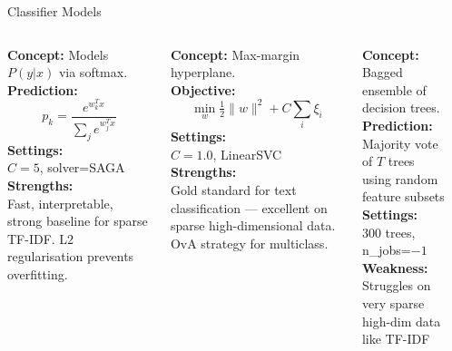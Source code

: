 \documentclass[aspectratio=169,11pt]{beamer}
\begin{document}
\begin{frame}{Classifier Models}
\begin{columns}[T]
    \begin{tcolorbox}[colback=worldcol!10,colframe=worldcol,title=Logistic Regression,fonttitle=\tiny\bfseries,height=7cm]
      \tiny
      \textbf{Concept:} Models $P(y|x)$ via softmax.\\[3pt]
      \textbf{Prediction:}
      \[p_k = \frac{e^{w_k^T x}}{\sum_j e^{w_j^T x}}\]
      \textbf{Settings:}\\
      $C=5$, solver=SAGA\\[3pt]
      \textbf{Strengths:}\\
      Fast, interpretable, strong baseline for sparse TF-IDF. L2 regularisation prevents overfitting.
    \end{tcolorbox}
    \begin{tcolorbox}[colback=sportscol!10,colframe=sportscol,title=Linear SVM,fonttitle=\tiny\bfseries,height=7cm]
      \tiny
      \textbf{Concept:} Max-margin hyperplane.\\[3pt]
      \textbf{Objective:}
      \[\min_w \tfrac{1}{2}\|w\|^2 + C\sum_i \xi_i\]
      \textbf{Settings:}\\
      $C=1.0$, LinearSVC\\[3pt]
      \textbf{Strengths:}\\
      Gold standard for text classification --- excellent on sparse high-dimensional data. OvA strategy for multiclass.
    \end{tcolorbox}
    \begin{tcolorbox}[colback=businesscol!10,colframe=businesscol,title=Random Forest,fonttitle=\tiny\bfseries,height=7cm]
      \tiny
      \textbf{Concept:} Bagged ensemble of decision trees.\\[3pt]
      \textbf{Prediction:}\\
      Majority vote of $T$ trees using random feature subsets\\[3pt]
      \textbf{Settings:}\\
      300 trees, n\_jobs=$-1$\\[3pt]
      \textbf{Weakness:}\\
      Struggles on very sparse high-dim data like TF-IDF
    \end{tcolorbox}
    \begin{tcolorbox}[colback=scitechcol!10,colframe=scitechcol,title=MLP Neural Net,fonttitle=\tiny\bfseries,height=7cm]

\end{tcolorbox}
\end{columns}
\end{frame}
\end{document}
